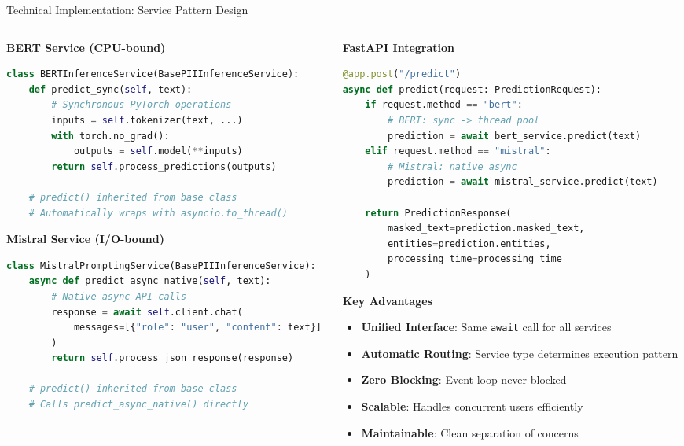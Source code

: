 \documentclass[aspectratio=169]{beamer}
\begin{document}
\begin{frame}{Technical Implementation: Service Pattern Design}
\begin{columns}
\begin{column}{0.5\textwidth}
\textbf{BERT Service (CPU-bound)}
\begin{lstlisting}[language=python,basicstyle=\tiny]
class BERTInferenceService(BasePIIInferenceService):
    def predict_sync(self, text):
        # Synchronous PyTorch operations
        inputs = self.tokenizer(text, ...)
        with torch.no_grad():
            outputs = self.model(**inputs)
        return self.process_predictions(outputs)
    
    # predict() inherited from base class
    # Automatically wraps with asyncio.to_thread()
\end{lstlisting}

\vspace{0.3cm}
\textbf{Mistral Service (I/O-bound)}
\begin{lstlisting}[language=python,basicstyle=\tiny]
class MistralPromptingService(BasePIIInferenceService):
    async def predict_async_native(self, text):
        # Native async API calls
        response = await self.client.chat(
            messages=[{"role": "user", "content": text}]
        )
        return self.process_json_response(response)
    
    # predict() inherited from base class
    # Calls predict_async_native() directly
\end{lstlisting}
\end{column}
\begin{column}{0.5\textwidth}
\textbf{FastAPI Integration}
\begin{lstlisting}[language=python,basicstyle=\tiny]
@app.post("/predict")
async def predict(request: PredictionRequest):
    if request.method == "bert":
        # BERT: sync -> thread pool
        prediction = await bert_service.predict(text)
    elif request.method == "mistral":
        # Mistral: native async
        prediction = await mistral_service.predict(text)
    
    return PredictionResponse(
        masked_text=prediction.masked_text,
        entities=prediction.entities,
        processing_time=processing_time
    )
\end{lstlisting}

\vspace{0.3cm}
\textbf{Key Advantages}
\begin{itemize}
\item \textbf{Unified Interface}: Same \texttt{await} call for all services
\item \textbf{Automatic Routing}: Service type determines execution pattern
\item \textbf{Zero Blocking}: Event loop never blocked
\item \textbf{Scalable}: Handles concurrent users efficiently
\item \textbf{Maintainable}: Clean separation of concerns
\end{itemize}
\end{column}
\end{columns}
\end{frame}
\end{document}
